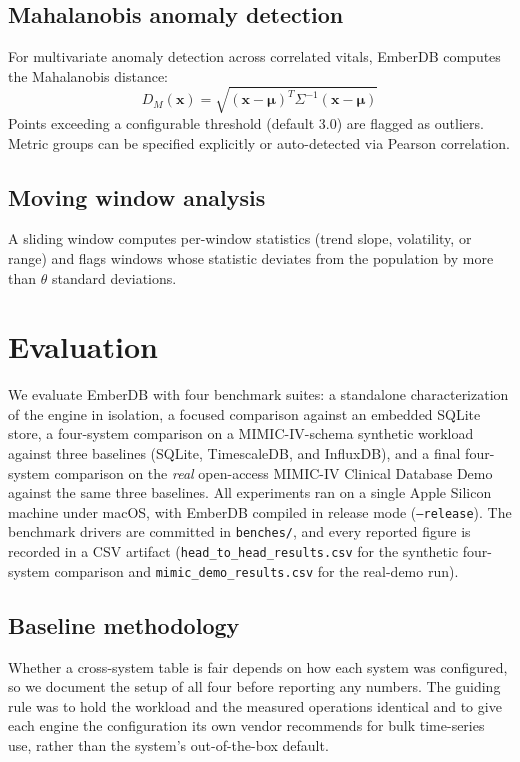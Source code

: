 \documentclass[journal]{IEEEtran}
\begin{document}
\subsection{Mahalanobis anomaly detection}
For multivariate anomaly detection across correlated vitals, EmberDB computes the Mahalanobis distance:
\[
D_M(\mathbf{x}) = \sqrt{(\mathbf{x} - \boldsymbol{\mu})^T \Sigma^{-1} (\mathbf{x} - \boldsymbol{\mu})}
\]
Points exceeding a configurable threshold (default 3.0) are flagged as outliers.
Metric groups can be specified explicitly or auto-detected via Pearson correlation.

\subsection{Moving window analysis}
A sliding window computes per-window statistics (trend slope, volatility, or range) and flags windows whose statistic deviates from the population by more than $\theta$ standard deviations.

\section{Evaluation}
\label{sec:eval}

We evaluate EmberDB with four benchmark suites: a standalone characterization of the engine in isolation, a focused comparison against an embedded SQLite store, a four-system comparison on a MIMIC-IV-schema synthetic workload against three baselines (SQLite, TimescaleDB, and InfluxDB), and a final four-system comparison on the \emph{real} open-access MIMIC-IV Clinical Database Demo against the same three baselines. All experiments ran on a single Apple Silicon machine under macOS, with EmberDB compiled in release mode (\texttt{--release}). The benchmark drivers are committed in \texttt{benches/}, and every reported figure is recorded in a CSV artifact (\texttt{head\_to\_head\_results.csv} for the synthetic four-system comparison and \texttt{mimic\_demo\_results.csv} for the real-demo run).

\subsection{Baseline methodology}
\label{sec:eval-methodology}

Whether a cross-system table is fair depends on how each system was configured, so we document the setup of all four before reporting any numbers. The guiding rule was to hold the workload and the measured operations identical and to give each engine the configuration its own vendor recommends for bulk time-series use, rather than the system's out-of-the-box default.
\end{document}
